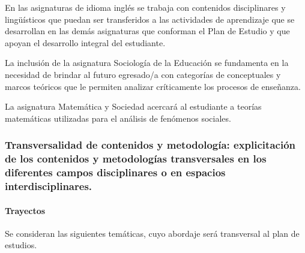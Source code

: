 \documentclass[a4paper, 12pt]{article}
\begin{document}
En las asignaturas de idioma inglés  se trabaja con contenidos disciplinares y lingüísticos que puedan ser transferidos a las actividades de aprendizaje que se desarrollan en las demás asignaturas que conforman el Plan de Estudio y que apoyan el desarrollo integral del estudiante.
 

La inclusión de la asignatura Sociología de la Educación se fundamenta en la necesidad de brindar al futuro egresado/a con categorías de conceptuales y marcos teóricos que le permiten analizar críticamente los procesos de enseñanza. 

La asignatura Matemática y Sociedad acercará al estudiante a teorías matemáticas utilizadas para el análisis de fenómenos sociales. 

\subsubsection{Transversalidad de contenidos y metodología: explicitación de los contenidos y metodologías transversales en los diferentes campos disciplinares o en espacios interdisciplinares.}


\paragraph{Trayectos}

Se consideran las siguientes temáticas, cuyo abordaje será transversal al plan de estudios. 
\end{document}
